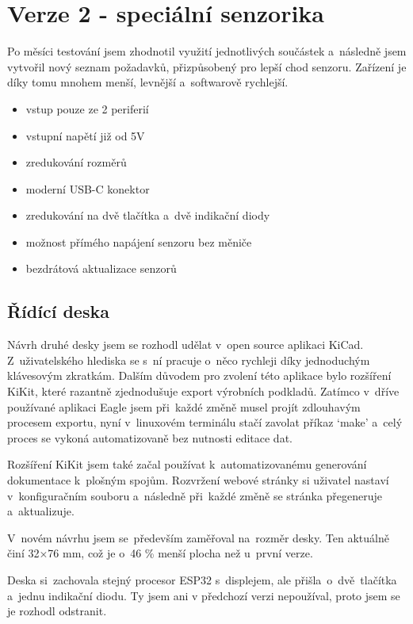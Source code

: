 \newpage


\section{Verze 2 - speciální senzorika}

Po měsíci testování jsem zhodnotil využití jednotlivých součástek a~následně jsem vytvořil nový seznam požadavků, přizpůsobený pro lepší chod senzoru.
Zařízení je díky tomu mnohem menší, levnější a~softwarově rychlejší.

\begin{itemize}
    \item vstup pouze ze 2 periferií
    \item vstupní napětí již od 5V
    \item zredukování rozměrů
    \item moderní USB-C konektor
    \item zredukování na dvě tlačítka a~dvě indikační diody
    \item možnost přímého napájení senzoru bez měniče
    \item bezdrátová aktualizace senzorů
\end{itemize}

\subsection{Řídící deska}
Návrh druhé desky jsem se rozhodl udělat v~open source aplikaci KiCad.
Z~uživatelského hlediska se s~ní pracuje o~něco rychleji díky jednoduchým klávesovým zkratkám. 
Dalším důvodem pro zvolení této aplikace bylo roz\-ší\-ře\-ní KiKit, které razantně zjednodušuje export výrobních podkladů.
Zatímco v~dříve používané aplikaci Eagle jsem při~každé změně musel projít zdlouhavým procesem exportu, nyní v~linuxovém terminálu stačí zavolat příkaz `make' a~celý proces se vykoná automatizovaně bez nutnosti editace dat.

Rozšíření KiKit jsem také začal používat k~automatizovanému generování dokumentace k~plošným spojům.
Rozvržení webové stránky si uživatel nastaví v~konfiguračním souboru a~následně při~každé změně se stránka pře\-ge\-ne\-ru\-je a~aktualizuje.

V~novém návrhu jsem se~především zaměřoval na~rozměr desky.
Ten aktuálně činí 32$\times$76 mm, což je o~46 \% menší plocha než u~první verze.

Deska si~zachovala stejný procesor ESP32 s~displejem, ale přišla~o~dvě~tla\-čí\-tka a~jednu indikační diodu.
Ty jsem ani v předchozí verzi nepoužíval, proto jsem se je rozhodl odstranit.

